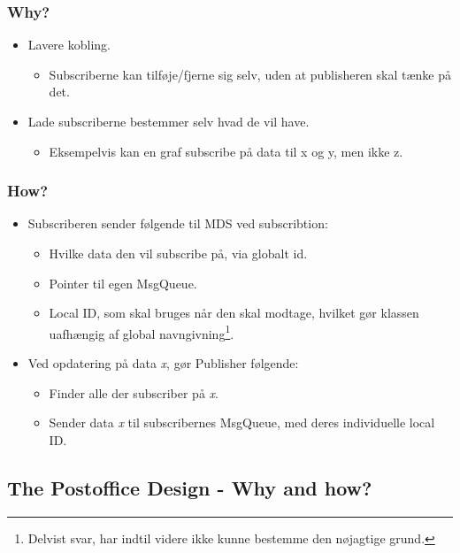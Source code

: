 \subsubsection{Why?}
\begin{itemize}
	\item Lavere kobling.
	\begin{itemize}
		\item Subscriberne kan tilføje/fjerne sig selv, uden at publisheren skal tænke på det.
	\end{itemize}
	\item Lade subscriberne bestemmer selv hvad de vil have.
	\begin{itemize}
		\item Eksempelvis kan en graf subscribe på data til x og y, men ikke z.
	\end{itemize}
\end{itemize}

\subsubsection{How?}
\begin{itemize}
	\item Subscriberen sender følgende til MDS ved subscribtion:
	\begin{itemize}
		\item Hvilke data den vil subscribe på, via globalt id.
		\item Pointer til egen MsgQueue.
		\item Local ID, som skal bruges når den skal modtage, hvilket gør klassen uafhængig af global navngivning\footnote{Delvist svar, har indtil videre ikke kunne bestemme den nøjagtige grund.}.
	\end{itemize}
	\item Ved opdatering på data \textit{x}, gør Publisher følgende:
	\begin{itemize}
		\item Finder alle der subscriber på \textit{x}.
		\item Sender data \textit{x} til subscribernes MsgQueue, med deres individuelle local ID.
	\end{itemize}
\end{itemize}


\subsection{The Postoffice Design - Why and how?}

